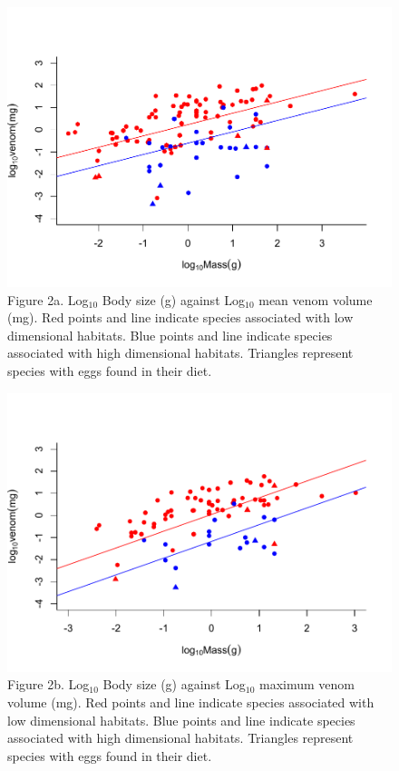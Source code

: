 \begin{figure}[h!]
  \centering
  \includegraphics[width=.95\textwidth]{ch4-snakes/figure2aver.pdf}%
  \caption[ ]{Figure 2a. Log$_{10}$ Body size (g) against Log$_{10}$ mean venom volume (mg). Red points and line indicate species associated with low dimensional habitats. Blue points and line indicate species associated with high dimensional habitats. Triangles represent species with eggs found in their diet.}
  \label{fig:Figure 1.}
\end{figure}




\begin{figure}[h!]
  \centering
  \includegraphics[width=.95\textwidth]{ch4-snakes/figure2max.pdf}%
  \caption[ ]{Figure 2b. Log$_{10}$ Body size (g) against Log$_{10}$ maximum venom volume (mg). Red points and line indicate species associated with low dimensional habitats. Blue points and line indicate species associated with high dimensional habitats. Triangles represent species with eggs found in their diet.}
  \label{fig:Figure 2b.}
\end{figure}


